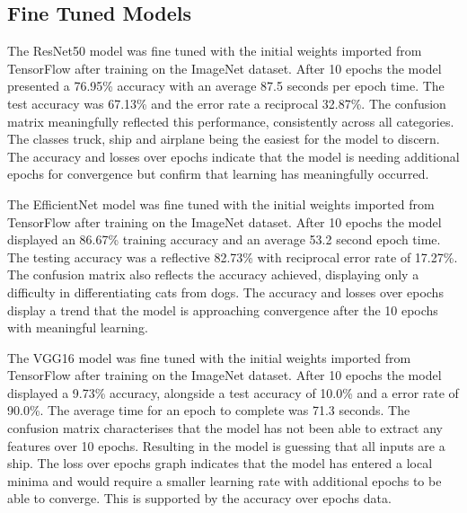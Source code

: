 \documentclass[10pt,twocolumn,letterpaper]{article}
\begin{document}
\subsection{Fine Tuned Models}
The ResNet50 model was fine tuned with the initial weights imported from TensorFlow after training on the ImageNet dataset. After 10 epochs the model presented a 76.95\% accuracy with an average 87.5 seconds per epoch time. The test accuracy was 67.13\% and the error rate a reciprocal 32.87\%. The confusion matrix meaningfully reflected this performance, consistently across all categories. The classes truck, ship and airplane being the easiest for the model to discern. The accuracy and losses over epochs indicate that the model is needing additional epochs for convergence but confirm that learning has meaningfully occurred.

The EfficientNet model was fine tuned with the initial weights imported from TensorFlow after training on the ImageNet dataset. After 10 epochs the model displayed an 86.67\% training accuracy and an average 53.2 second epoch time. The testing accuracy was a reflective 82.73\% with reciprocal error rate of 17.27\%. The confusion matrix also reflects the accuracy achieved, displaying only a difficulty in differentiating cats from dogs. The accuracy and losses over epochs display a trend that the model is approaching convergence after the 10 epochs with meaningful learning. 

The VGG16 model was fine tuned with the initial weights imported from TensorFlow after training on the ImageNet dataset. After 10 epochs the model displayed a 9.73\% accuracy, alongside a test accuracy of 10.0\% and a error rate of 90.0\%. The average time for an epoch to complete was 71.3 seconds. The confusion matrix characterises that the model has not been able to extract any features over 10 epochs. Resulting in the model is guessing that all inputs are a ship. The loss over epochs graph indicates that the model has entered a local minima and would require a smaller learning rate with additional epochs to be able to converge. This is supported by the accuracy over epochs data. 
\end{document}

